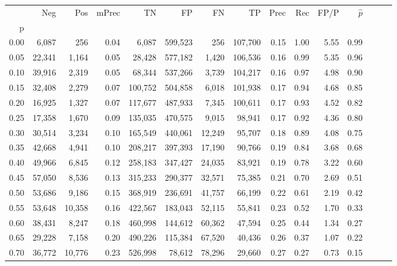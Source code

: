 \begin{tabular}{rrrrrrrrrrrrrrr}
\toprule
{} &     Neg &     Pos & mPrec &       TN &       FP &       FN &       TP &  Prec &   Rec &  FP/P & $\hat{p}$ \\
p    &         &         &       &          &          &          &          &       &       &       &           \\
\midrule
0.00 &   6,087 &     256 &  0.04 &    6,087 &  599,523 &      256 &  107,700 &  0.15 &  1.00 &  5.55 &      0.99 \\
0.05 &  22,341 &   1,164 &  0.05 &   28,428 &  577,182 &    1,420 &  106,536 &  0.16 &  0.99 &  5.35 &      0.96 \\
0.10 &  39,916 &   2,319 &  0.05 &   68,344 &  537,266 &    3,739 &  104,217 &  0.16 &  0.97 &  4.98 &      0.90 \\
0.15 &  32,408 &   2,279 &  0.07 &  100,752 &  504,858 &    6,018 &  101,938 &  0.17 &  0.94 &  4.68 &      0.85 \\
0.20 &  16,925 &   1,327 &  0.07 &  117,677 &  487,933 &    7,345 &  100,611 &  0.17 &  0.93 &  4.52 &      0.82 \\
0.25 &  17,358 &   1,670 &  0.09 &  135,035 &  470,575 &    9,015 &   98,941 &  0.17 &  0.92 &  4.36 &      0.80 \\
0.30 &  30,514 &   3,234 &  0.10 &  165,549 &  440,061 &   12,249 &   95,707 &  0.18 &  0.89 &  4.08 &      0.75 \\
0.35 &  42,668 &   4,941 &  0.10 &  208,217 &  397,393 &   17,190 &   90,766 &  0.19 &  0.84 &  3.68 &      0.68 \\
0.40 &  49,966 &   6,845 &  0.12 &  258,183 &  347,427 &   24,035 &   83,921 &  0.19 &  0.78 &  3.22 &      0.60 \\
0.45 &  57,050 &   8,536 &  0.13 &  315,233 &  290,377 &   32,571 &   75,385 &  0.21 &  0.70 &  2.69 &      0.51 \\
0.50 &  53,686 &   9,186 &  0.15 &  368,919 &  236,691 &   41,757 &   66,199 &  0.22 &  0.61 &  2.19 &      0.42 \\
0.55 &  53,648 &  10,358 &  0.16 &  422,567 &  183,043 &   52,115 &   55,841 &  0.23 &  0.52 &  1.70 &      0.33 \\
0.60 &  38,431 &   8,247 &  0.18 &  460,998 &  144,612 &   60,362 &   47,594 &  0.25 &  0.44 &  1.34 &      0.27 \\
0.65 &  29,228 &   7,158 &  0.20 &  490,226 &  115,384 &   67,520 &   40,436 &  0.26 &  0.37 &  1.07 &      0.22 \\
0.70 &  36,772 &  10,776 &  0.23 &  526,998 &   78,612 &   78,296 &   29,660 &  0.27 &  0.27 &  0.73 &      0.15 \\

\end{tabular}
